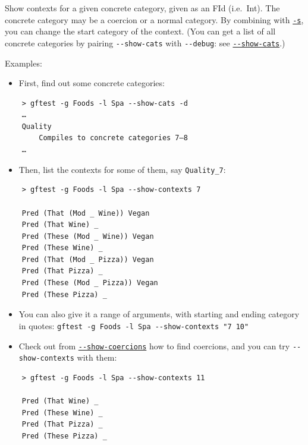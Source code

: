 Show contexts for a given concrete category, given as an FId (i.e.~Int).
The concrete category may be a coercion or a normal category. By
combining with
\protect\hyperlink{start-category-for-context--s}{\texttt{-s}}, you can
change the start category of the context.
(You can get a list of all concrete categories by pairing
\texttt{-\/-show-cats} with \texttt{-\/-debug}: see
\protect\hyperlink{--show-cats}{\texttt{-\/-show-cats}}.)

\noindent Examples:

\begin{itemize}
\tightlist
\item
  First, find out some concrete categories:
\end{itemize}

\begin{verbatim}
    > gftest -g Foods -l Spa --show-cats -d
    …
    Quality
        Compiles to concrete categories 7—8
    …
\end{verbatim}

\begin{itemize}
\tightlist
\item
  Then, list the contexts for some of them, say \texttt{Quality\_7}:
\end{itemize}

\begin{verbatim}
    > gftest -g Foods -l Spa --show-contexts 7

    Pred (That (Mod _ Wine)) Vegan
    Pred (That Wine) _
    Pred (These (Mod _ Wine)) Vegan
    Pred (These Wine) _
    Pred (That (Mod _ Pizza)) Vegan
    Pred (That Pizza) _
    Pred (These (Mod _ Pizza)) Vegan
    Pred (These Pizza) _
\end{verbatim}

\begin{itemize}
\item
  You can also give it a range of arguments, with starting and ending
  category in quotes:
  \texttt{gftest\ -g\ Foods\ -l\ Spa\ -\/-show-contexts\ "7\ 10"}
\item
  Check out from
  \protect\hyperlink{--show-coercions}{\texttt{-\/-show-coercions}} how
  to find coercions, and you can try \texttt{-\/-show-contexts} with
  them:
\end{itemize}

\begin{verbatim}
    > gftest -g Foods -l Spa --show-contexts 11

    Pred (That Wine) _
    Pred (These Wine) _
    Pred (That Pizza) _
    Pred (These Pizza) _
\end{verbatim}

